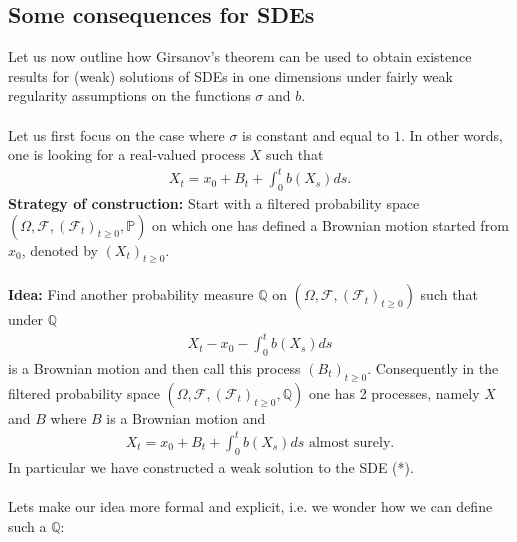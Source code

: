 \documentclass[../mainfile.tex]{subfiles}
\begin{document}
\subsection{Some consequences for SDEs}
Let us now outline how Girsanov's theorem can be used to obtain existence results for (weak) solutions of SDEs in one dimensions under fairly weak regularity assumptions on the functions $\sigma$ and $b$.
\\\\
Let  us first focus on the case where $\sigma$ is constant and equal to $1$. In other words, one is looking for a real-valued process $X$ such that
\begin{align*}
X_t = x_0 + B_t + \int_0^t b(X_s)ds. \tag{*}
\end{align*}
\textbf{Strategy of construction:} Start with a filtered probability space $( \Omega, \mathcal{F}, (\mathcal{F}_t)_{t \geq 0 }, \mathbb{P})$ on which one has defined a Brownian motion started from $x_0$, denoted by $(X_t)_{t \geq 0}$.
\\\\
\textbf{Idea:} Find another probability measure $\mathbb{Q}$ on $(\Omega, \mathcal{F}, ( \mathcal{F}_t)_{t \geq 0})$ such that under $\mathbb{Q}$ 
\begin{align*}
X_t-x_0- \int_0^t b(X_s)ds
\end{align*}
is a Brownian motion and then call this process $(B_t)_{t \geq 0}$. Consequently in the filtered probability space $( \Omega, \mathcal{F}, ( \mathcal{F}_t)_{t \geq 0}, \mathbb{Q})$ one has 2 processes, namely $X$ and $B$ where $B$ is a Brownian motion and 
\begin{align*}
X_t = x_0 + B_t + \int_0^t b(X_s)ds \text{ almost surely}. 
\end{align*}
In particular we have constructed a weak solution to the SDE (*).\\
\\
Lets make our idea more formal and explicit, i.e. we wonder how we can define such a $\mathbb{Q}$:
\end{document}
